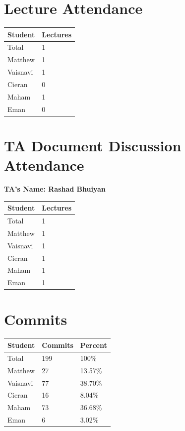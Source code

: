 \documentclass{article}
\begin{document}
\section{Lecture Attendance}

\begin{table}[H]
\centering
\begin{tabular}{ll}
\toprule
\textbf{Student} & \textbf{Lectures}\\
\midrule
Total & 1\\
Matthew & 1\\
Vaisnavi & 1\\
Cieran & 0\\
Maham & 1\\
Eman & 0\\
\bottomrule
\end{tabular}
\end{table}

\section{TA Document Discussion Attendance}

\noindent \textbf{TA's Name: Rashad Bhuiyan} 

\begin{table}[H]
\centering
\begin{tabular}{ll}
\toprule
\textbf{Student} & \textbf{Lectures}\\
\midrule
Total & 1\\
Matthew & 1\\
Vaisnavi & 1\\
Cieran & 1\\
Maham & 1\\
Eman & 1\\
\bottomrule
\end{tabular}
\end{table}

\section{Commits}

\begin{table}[H]
\centering
\begin{tabular}{lll}
\toprule
\textbf{Student} & \textbf{Commits} & \textbf{Percent}\\
\midrule
Total & 199 & 100\% \\
Matthew & 27 & 13.57\% \\
Vaisnavi & 77 & 38.70\% \\
Cieran & 16 & 8.04\% \\
Maham & 73 & 36.68\% \\
Eman & 6 & 3.02\% \\
\bottomrule
\end{tabular}
\end{table}
\end{document}
